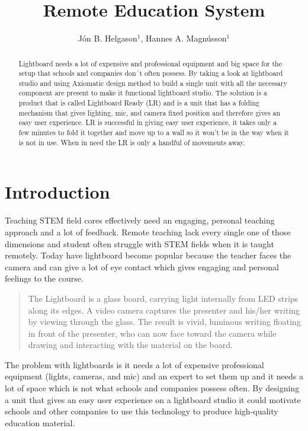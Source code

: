 \documentclass[a4paper]{jpconf}
\begin{document}
	\title{Remote Education System}
	
	\author{ J\'on B. Helgason$^{1}$, Hannes A. Magnússon$^{1}$}
	
	\address{$^{1}$Reykjavik University, Menntavegur 1, Reykjavik 102, Iceland}
	
	
	\begin{abstract}
		Lightboard needs a lot of expensive and professional equipment and big space for the setup that schools and companies don´t often possess.
		By taking a look at lightboard studio and using Axiomatic design method to build a single unit with all the necessary component are present to make it functional lightboard studio.
		The solution is a product that is called Lightboard Ready (LR) and is a unit that has a folding mechanism that gives lighting, mic, and camera fixed position and therefore gives an easy user experience.
		LR is successful in giving easy user experience, it takes only a few minutes to fold it together and move up to a wall so it won't be in the way when it is not in use. When in need the LR is only a handful of movements away.
	\end{abstract}
	
	
	
	\section{Introduction}
	Teaching STEM field cores effectively need an engaging, personal teaching approach and a lot of feedback. Remote teaching lack every single one of those dimensions and student often struggle with STEM fields when it is taught remotely. Today have lightboard become popular because the teacher faces the camera and can give a lot of eye contact which gives engaging and personal feelings to the course. 
	\begin{quote}
		The Lightboard is a glass board, carrying light internally from LED strips along its edges. A video camera captures the presenter and his/her writing by viewing through the glass. The result is vivid, luminous writing floating in front of the presenter, who can now face toward the camera while drawing and interacting with the material on the board.\cite{birdwell2015capturing}
	\end{quote}
	The problem with lightboards is it needs a lot of expensive professional equipment (lights, cameras, and mic) and an expert to set them up and it needs a lot of space which is not what schools and companies possess often. 
	By designing a unit that gives an easy user experience on a lightboard studio it could motivate schools and other companies to use this technology to produce high-quality education material.
	
\end{document}
